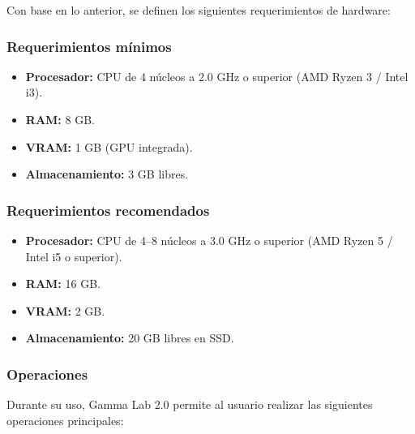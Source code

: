 \documentclass[12pt, letterpaper]{article}
\begin{document}
Con base en lo anterior, se definen los siguientes requerimientos de
hardware:

\subsubsection*{Requerimientos mínimos}

\begin{itemize}
    \item \textbf{Procesador:} CPU de 4 núcleos a 2.0 GHz o superior
    (AMD Ryzen 3 / Intel i3).
    \item \textbf{RAM:} 8 GB.
    \item \textbf{VRAM:} 1 GB (GPU integrada).
    \item \textbf{Almacenamiento:} 3 GB libres.
\end{itemize}

\subsubsection*{Requerimientos recomendados}

\begin{itemize}
    \item \textbf{Procesador:} CPU de 4--8 núcleos a 3.0 GHz o superior
    (AMD Ryzen 5 / Intel i5 o superior).
    \item \textbf{RAM:} 16 GB.
    \item \textbf{VRAM:} 2 GB.
    \item \textbf{Almacenamiento:} 20 GB libres en SSD.
\end{itemize}

\subsubsection{Operaciones}

Durante su uso, Gamma Lab 2.0 permite al usuario realizar las siguientes
operaciones principales:
\end{document}

